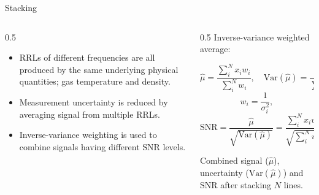 \documentclass[aspectratio=169,t]{beamer}
\begin{document}
\begin{frame}{Stacking}{}
  \begin{columns}[T]
    \begin{column}{0.5\linewidth}
      \begin{itemize}
        \item RRLs of different frequencies are all produced by the same underlying physical quantities; gas temperature and density.
        \item Measurement uncertainty is reduced by averaging signal from multiple RRLs.
        \item Inverse-variance weighting is used to combine signals having different SNR levels.
      \end{itemize}
    \end{column}
    \begin{column}{0.5\linewidth}
      \centering
      {Inverse-variance weighted average:}
      \par\smallskip
      \begin{equation*}
        \hat{\mu} = \frac{\sum_i^N x_i w_i }{\sum_i^N w_i}, \quad \text{Var}(\hat{\mu}) = \frac{1}{\sum_i^N w_i},
      \end{equation*}
      \begin{equation*}
        w_i = \frac{1}{\sigma_i^2},
      \end{equation*}
      \begin{equation*}
        \text{SNR} = \frac{\hat{\mu}}{\sqrt{\text{Var}(\hat{\mu})}} = \frac{\sum_i^N x_i w_i}{\sqrt{\sum_i^N w_i}}.
      \end{equation*}
      \par\medskip
      {\footnotesize Combined signal ($\hat{\mu}$), uncertainty ($\text{Var}(\hat{\mu})$) and SNR after stacking $N$ lines.}
    \end{column}
  \end{columns}
\end{frame}

\setcounter{framenumber}{\value{cookiemaintotal}}
\end{document}
